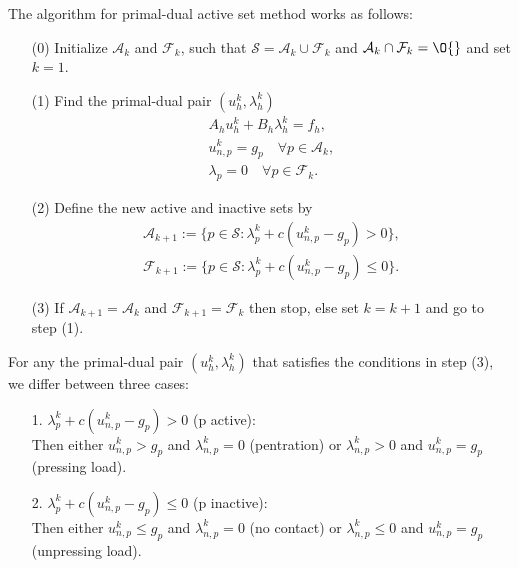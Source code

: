 \documentclass{article}
\begin{document}
The algorithm for primal-dual active set method works as follows:
\begin{itemize}
 \item [(0)] Initialize $\mathcal{A}_k$ and $\mathcal{F}_k$, such that $\mathcal{S}=\mathcal{A}_k\cup\mathcal{F}_k$ and $\mathcal{A}_k\cap\mathcal{F}_k=\O{}$ and set $k=1$.
 \item [(1)] Find the primal-dual pair $(u^k_h,\lambda^k_h)$\\
 \begin{equation}
 \begin{split}
  A_h u^k_h + B_h\lambda^k_h = f_h,\\
  u^k_{n,p} = g_p\quad\forall p\in\mathcal{A}_k,\\
  \lambda_p = 0\quad\forall p\in\mathcal{F}_k.
 \end{split}
 \end{equation}
 \item [(2)] Define the new active and inactive sets by
 \begin{equation}
 \begin{split}
  \mathcal{A}_{k+1}:=\lbrace p\in\mathcal{S}:\lambda^k_p + c(u^k_{n,p} - g_p)> 0\rbrace,\\
  \mathcal{F}_{k+1}:=\lbrace p\in\mathcal{S}:\lambda^k_p + c(u^k_{n,p} - g_p)\leq 0\rbrace.
 \end{split}
 \end{equation}
 \item [(3)] If $\mathcal{A}_{k+1}=\mathcal{A}_k$ and $\mathcal{F}_{k+1}=\mathcal{F}_k$ then stop, else set $k=k+1$ and go to step (1).
\end{itemize}
For any the primal-dual pair $(u^k_h,\lambda^k_h)$ that satisfies the conditions in step (3), we differ between three cases:
\begin{itemize}
 \item [1.] $\lambda^k_p + c(u^k_{n,p} - g_p)> 0$ (p active):\\
  Then either $u^k_{n,p}>g_p$ and $\lambda^k_{n,p}=0$ (pentration) or $\lambda^k_{n,p}>0$ and $u^k_{n,p}=g_p$ (pressing load).
 \item [2.] $\lambda^k_p + c(u^k_{n,p} - g_p)\leq 0$ (p inactive):\\
  Then either $u^k_{n,p}\leq g_p$ and $\lambda^k_{n,p}=0$ (no contact) or $\lambda^k_{n,p}\leq0$ and $u^k_{n,p}=g_p$ (unpressing load).
\end{itemize}
\end{document}
